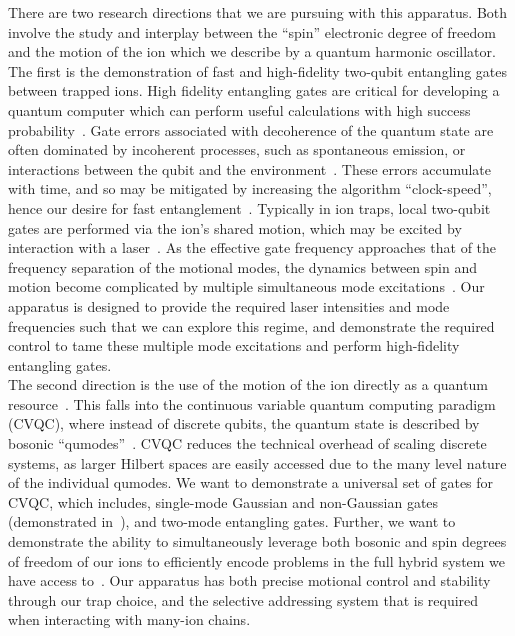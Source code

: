     There are two research directions that we are pursuing with this apparatus.
    Both involve the study and interplay between the ``spin'' electronic degree
    of freedom and the motion of the ion which we describe by a quantum harmonic
    oscillator.\\
    The first is the demonstration of fast and high-fidelity two-qubit
    entangling gates between trapped ions. High fidelity entangling gates are
    critical for developing a quantum computer which can perform useful
    calculations with high success probability~\cite{steane2003overhead}. Gate errors associated with
    decoherence of the quantum state are often dominated by incoherent
    processes, such as spontaneous emission, or interactions between the qubit
    and the environment~\cite{wineland1998experimental}. These errors accumulate with time, and so may be
    mitigated by increasing the algorithm ``clock-speed'', hence our desire for
    fast entanglement~\cite{steane2000speed,schafer2018fast}. Typically in ion traps, local two-qubit gates are
    performed via the ion's shared motion, which may be excited by interaction
    with a laser~\cite{cirac1995quantum, sorensen2000entanglement}. As the effective gate frequency approaches that of the
    frequency separation of the motional modes, the dynamics between spin and
    motion become complicated by multiple simultaneous mode excitations~\cite{schafer2018fast}. Our
    apparatus is designed to provide the required laser intensities and mode
    frequencies such that we can explore this regime, and demonstrate the
    required control to tame these multiple mode excitations and perform
    high-fidelity entangling gates.\\
    The second direction is the use of the motion of the ion directly as a
    quantum resource~\cite{liu2024hybrid,chen2021quantum}. This falls into the continuous variable quantum computing
    paradigm (CVQC), where instead of discrete qubits, the quantum state is
    described by bosonic ``qumodes''~\cite{lloyd1999quantum}. CVQC reduces the
    technical overhead of scaling discrete systems, as larger Hilbert spaces are
    easily accessed due to the many level nature of the individual qumodes.
    We want to demonstrate a
    universal set of gates for CVQC, which includes, single-mode Gaussian and
    non-Gaussian gates (demonstrated in~\cite{bazavan2024squeezing}), and two-mode entangling gates. Further, we want to demonstrate the ability to simultaneously leverage both
    bosonic and spin degrees of freedom of our ions to efficiently encode
    problems in the full hybrid system we have access to~\cite{varona2024towards, brenner2024factoring}. Our apparatus has both
    precise motional control and stability through our trap choice, and the
    selective addressing system that is required when interacting with many-ion
    chains.\\
    
